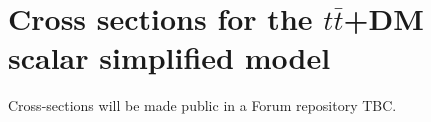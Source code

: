 %
%

\section{\texorpdfstring{Cross sections for the $t\bar t$+DM scalar simplified model}{Cross sections for the ttbar+DM scalar simplified model}}

Cross-sections will be made public in a Forum repository TBC. 

